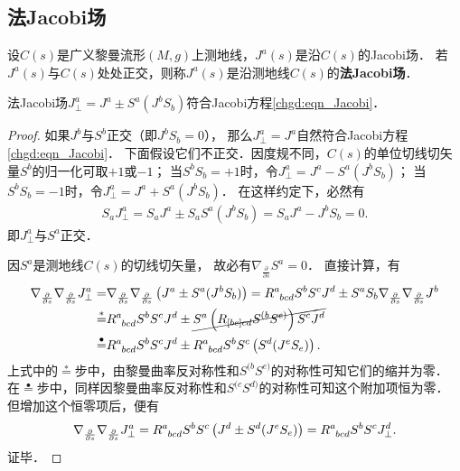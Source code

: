 
\subsection{法Jacobi场}
\begin{definition}\label{chgd:def_normal-Jacobi}
    设$C(s)$是广义黎曼流形$(M,g)$上测地线，$J^a(s)$是沿$C(s)$的Jacobi场．
    若$J^a(s)$与$C(s)$处处正交，则称$J^a(s)$是沿测地线$C(s)$的{\heiti \bfseries 法Jacobi场}．  
\end{definition}

\begin{proposition}
	法Jacobi场$J^a_{\perp}=J^a \pm S^a (J^b S_b) $符合Jacobi方程\eqref{chgd:eqn_Jacobi}．
\end{proposition}
\begin{proof}
	如果$J^b$与$S^b$正交（即$J^b S_b=0$），
	那么$J^a_{\perp}=J^a$自然符合Jacobi方程\eqref{chgd:eqn_Jacobi}．
	下面假设它们不正交．因度规不同，$C(s)$的单位切线切矢量$S^b$的归一化可取$+1$或$-1$；
	当$S^b S_b =+1$时，令$J^a_{\perp}=J^a - S^a (J^b S_b) $；
	当$S^b S_b =-1$时，令$J^a_{\perp}=J^a + S^a (J^b S_b) $．
	在这样约定下，必然有
	\begin{align*}
		S_a J^a_{\perp}=S_a J^a \pm S_aS^a (J^b S_b) = S_a J^a - J^b S_b = 0.
	\end{align*}
	即$J^a_\perp$与$S^a$正交．

    因$S^a$是测地线$C(s)$的切线切矢量，
    故必有$\nabla_{\frac{\partial}{\partial s}}S^a=0$．
    直接计算，有
    \begin{align*}
    	\nabla_{\frac{\partial}{\partial s}} \nabla_{\frac{\partial}{\partial s}} J^a_{\perp}
    	=& \nabla_{\frac{\partial}{\partial s}} \nabla_{\frac{\partial}{\partial s}} \left( J^a \pm S^a (J^b S_b)\right)
    	= R^{a}_{\hphantom{a} bcd} {S}^b {S}^c{J}^d
    	\pm S^a S_b \nabla_{\frac{\partial}{\partial s}}\nabla_{\frac{\partial}{\partial s}} J^b \\
    	\overset{*}{=}& R^{a}_{\hphantom{a} bcd} {S}^b {S}^c{J}^d
    	\pm \cancel{S^a \left(R_{[be]cd} S^{(b} S^{e)} \right) {S}^c{J}^d} \\
    	\overset{\bullet}{=}& R^{a}_{\hphantom{a} bcd} {S}^b {S}^c {J}^d \pm 
    	R^{a}_{\hphantom{a} bcd} {S}^b {S}^c \left( S^d (J^e S_e) \right) .
    \end{align*}
    上式中的$\overset{*}{=}$步中，由黎曼曲率反对称性和$S^{(b} S^{e)}$的对称性可知它们的缩并为零．
    在$\overset{\bullet}{=}$步中，同样因黎曼曲率反对称性和$S^{(c} S^{d)}$的对称性可知这个附加项恒为零．
    但增加这个恒零项后，便有
    \begin{align*}
    	\nabla_{\frac{\partial}{\partial s}} \nabla_{\frac{\partial}{\partial s}} J^a_{\perp}
    	= R^{a}_{\hphantom{a} bcd} {S}^b {S}^c \left( {J}^d \pm S^d (J^e S_e) \right)
    	= R^{a}_{\hphantom{a} bcd} {S}^b {S}^c {J}^d_\perp.
    \end{align*}
    证毕．
\end{proof}


